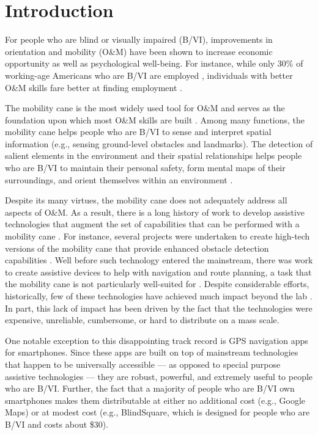 \documentclass[chi]{sigchi}
\def\plainkeywords{orientation and mobility; augmented reality; assistive tech}
\newcommand{\BVI}{B/VI\xspace}
\newcommand{\OM}{O\&M\xspace}
\begin{document}
\keywords{\plainkeywords}
\section{Introduction}
For people who are blind or visually impaired (\BVI), improvements in orientation and mobility (\OM) have been shown to increase economic opportunity as well as psychological well-being.  For instance, while only 30\% of working-age Americans who are \BVI are employed \cite{employmentstatistics2017, kirchner1999looking}, individuals with better \OM skills fare better at finding employment \cite{crudden1998comprehensive, crudden1999barriers, leonard1999factors, o1999employment}.

The mobility cane is the most widely used tool for \OM and serves as the foundation upon which most \OM skills are built \cite{wiener2010foundations}.  Among many functions, the mobility cane helps people who are \BVI to sense and interpret spatial information (e.g., sensing ground-level obstacles and landmarks).  The detection of salient elements in the environment and their spatial relationships helps people who are \BVI to maintain their personal safety, form mental maps of their surroundings, and orient themselves within an environment \cite{thinus1997representation, schinazi2016spatial}.

Despite its many virtues, the mobility cane does not adequately address all aspects of \OM.  As a result, there is a long history of work to develop assistive technologies that augment the set of capabilities that can be performed with a mobility cane \cite{wiener2010foundations}.  For instance, several projects were undertaken to create high-tech versions of the mobility cane that provide enhanced obstacle detection capabilities \cite{benjamin1973new, borenstein1997guidecane}.  Well before such technology entered the mainstream, there was  work to create assistive devices to help with navigation and route planning, a task that the mobility cane is not particularly well-suited for \cite{dakopoulos2010wearable}.  Despite considerable efforts, historically, few of these technologies have achieved much impact beyond the lab \cite{wiener2010foundations}.  In part, this lack of impact has been driven by the fact that the technologies were expensive, unreliable, cumbersome, or hard to distribute on a mass scale.

One notable exception to this disappointing track record is GPS navigation apps for smartphones.  Since these apps are built on top of mainstream technologies that happen to be universally accessible --- as opposed to special purpose assistive technologies --- they are robust, powerful, and extremely useful to people who are \BVI.  Further, the fact that a majority of people who are \BVI own smartphones \cite{morris2014blind} makes them distributable at either no additional cost (e.g., Google Maps) or at modest cost (e.g., BlindSquare, which is designed for people who are \BVI and costs about \$30).
\end{document}
